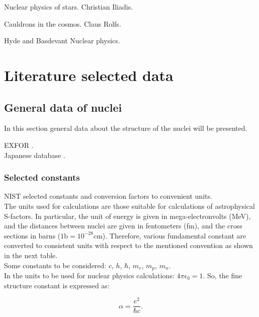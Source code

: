 \documentclass[openany]{book}
\begin{document}
Nuclear physics of stars. Christian Iliadis.

\vspace{1in}
Cauldrons in the cosmos.  Claus Rolfs.

\vspace{1in}
Hyde and Basdevant Nuclear physics.

\appendix

\chapter{Literature selected data} \label{ap:literatureData}

\section{General data of nuclei} \label{sec:nucleiData}

In this section general data about the structure of the nuclei will be presented. 

EXFOR \cite{zerkin_pritychenko_totans_vrapcenjak_rodionov_shulyak_2022}. \\
Japanese database \cite{iwamoto_iwamoto_shibata_ichihara_kunieda_minato_nakayama_2020}.

\subsection{Selected constants} \label{sub:selectedConstants}

NIST selected constants and conversion factors to convenient units. \\

The units used for calculations are those suitable for calculations of astrophysical S-factors. In particular, the unit of energy is given in mega-electronvolts (MeV), and the distances between nuclei are given in fentometers (fm), and the cross sections in barns ($\mathrm{1b = 10^{-28}cm}$). Therefore, various fundamental constant are converted to consistent units with respect to the mentioned convention as shown in the next table. \\

Some constants to be considered: $c$, $h$, $\hbar$, $m_e$, $m_p$, $m_n$. \\

In the units to be used for nuclear physics calculations: $4\pi\epsilon_0 = 1$. So, the fine structure constant is expressed as:

\begin{equation} \label{eq:constants_alpha}
	\alpha = \frac{e^2}{\hbar c}.
\end{equation}
\end{document}
